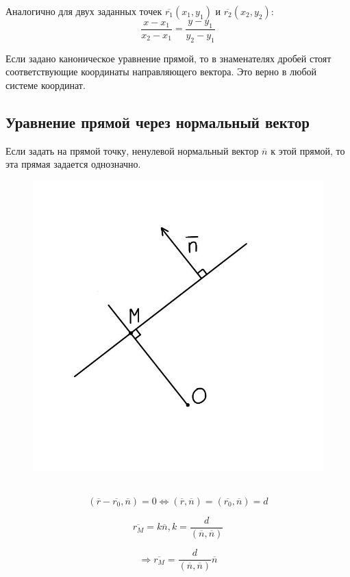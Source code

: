 Аналогично для двух заданных точек $\overline{r_1}(x_1, y_1)$ и $\overline{r_2}(x_2, y_2)$:
\[
\dfrac{x - x_1}{x_2 - x_1} = \dfrac{y - y_1}{y_2 - y_1}
\]

\begin{corollary}
    Если задано каноническое уравнение прямой, то в знаменателях дробей стоят соответствующие координаты направляющего вектора. Это верно в любой системе координат.
\end{corollary}

\subsection{Уравнение прямой через нормальный вектор}

Если задать на прямой точку, ненулевой нормальный вектор $\overline{n}$ к этой прямой, то эта прямая задается однозначно.

\begin{figure}
	\includegraphics[width=0.84\linewidth]{images/1.2.jpeg}
\end{figure}

\tab\\

\[
(\overline{r} - \overline{r_0}, \overline{n}) = 0 \Longleftrightarrow (\overline{r}, \overline{n}) = (\overline{r_0}, \overline{n}) = d
\]

\[
\overline{r_M} = k\overline{n}, k = \dfrac{d}{(\overline{n}, \overline{n})}
\]

\[
\Longrightarrow \overline{r_M} = \dfrac{d}{(\overline{n}, \overline{n})}\overline{n}
\]

